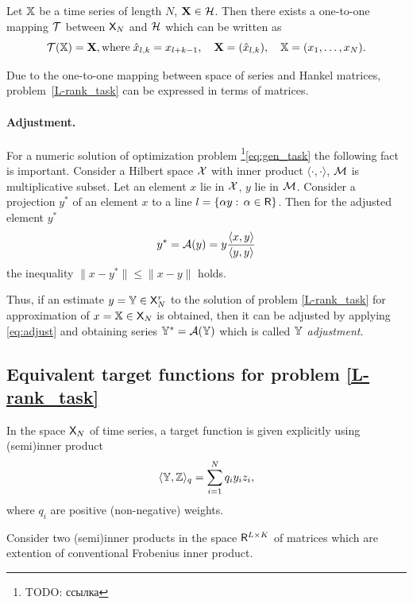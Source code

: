 \documentclass[12pt,a4paper,fleqn,leqno]{article}
\begin{document}
Let $\mathbb{X}$ be a time series of length $N$, $\mathbf{X} \in \mathcal{H}$. Then there exists a one-to-one mapping $\mathcal{T}$ between $\mathsf{X}_N$ and $\mathcal{H}$ which can be written as
\begin{equation*}
\mathcal{T}(\mathbb{X}) = \mathbf{X}, \text{where} \; \hat x_{l, k} = x_{l + k - 1}, \quad \mathbf{X} = (\hat x_{l,k}), \quad \mathbb{X} = (x_1, \ldots, x_N).
\end{equation*}

Due to the one-to-one mapping between space of series and Hankel matrices,
problem~\eqref{L-rank_task} can be expressed in terms of matrices.

\paragraph{Adjustment.} For a numeric solution of optimization problem \footnote{TODO: ссылка}\eqref{eq:gen_task} the following fact is important.
Consider a Hilbert space $\mathcal{X}$ with inner product $\langle\cdot, \cdot\rangle$, $\mathcal{M}$ is multiplicative subset. Let an element $x$ lie in $\mathcal{X}$, $y$ lie in $\mathcal{M}$. Consider a projection $y^*$ of an element $x$ to a line $l = \{\alpha y:\, \alpha \in \mathsf{R}\}$. Then for the adjusted element $y^*$
\begin{equation}
\label{eq:adjust}
y^* = \mathcal{A}(y)= y \frac{\langle x, y\rangle}{\langle y, y\rangle}
\end{equation}
the inequality $\|x - y^*\| \le \|x - y\|$ holds.

Thus, if an estimate $y=\mathbb{Y} \in \mathsf{X}_N^r$ to the solution of problem \eqref{L-rank_task} for approximation of $x=\mathbb{X} \in \mathsf{X}_N$ is obtained, then it can be adjusted by applying \eqref{eq:adjust} and obtaining series $\mathbb{Y}^*=\mathcal{A}(\mathbb{Y})$ which is called \emph{$\mathbb{Y}$ adjustment}.

\subsection{Equivalent target functions for problem \eqref{L-rank_task}}
In the space $\mathsf{X}_N$ of time series, a target function is given explicitly using (semi)inner product
\begin{equation}
\label{eq:norm_ser}
    \langle\mathbb{Y},\mathbb{Z}\rangle_q = \sum_{i = 1}^N q_i y_i z_i,
\end{equation}
where $q_i$ are positive (non-negative) weights.

Consider two (semi)inner products in the space $\mathsf{R}^{L \times K}$ of matrices which are extention of conventional Frobenius inner product.
\end{document}
